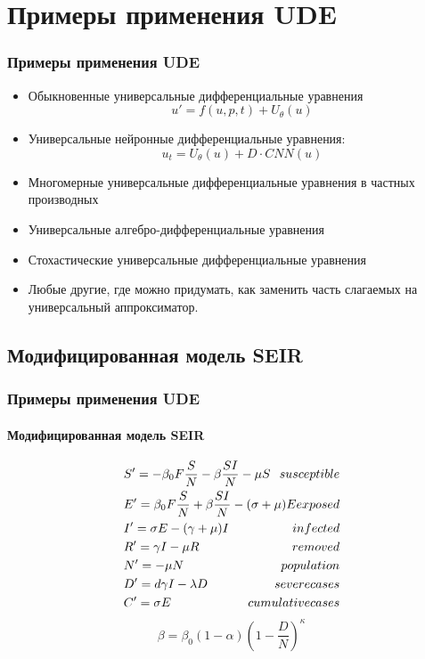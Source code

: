 \documentclass[10pt,pdf,hyperref={unicode}]{beamer}
\begin{document}
		
	\section{Примеры применения UDE}
	
		\begin{frame}
			\frametitle{Примеры применения UDE} 
				\begin{itemize}
					\item Обыкновенные универсальные дифференциальные уравнения
					\begin{displaymath}
						u' = f(u,p,t) + U_\theta(u)
					\end{displaymath}
					\item Универсальные нейронные дифференциальные уравнения:
					\begin{displaymath}
						u_t = U_\theta(u) + D\cdot CNN(u)
					\end{displaymath}
					\item Многомерные универсальные дифференциальные уравнения в частных производных
					\item Универсальные алгебро-дифференциальные уравнения
					\item Стохастические универсальные дифференциальные уравнения
					\item Любые другие, где можно придумать, как заменить часть слагаемых на универсальный аппроксиматор.
				\end{itemize}  
		\end{frame}
	
		
		\subsection{Модифицированная модель SEIR}
		
			\begin{frame}
				\frametitle{Примеры применения UDE} 
				\framesubtitle{Модифицированная модель SEIR}
					\begin{center}
						\begin{displaymath}
							\begin{gathered}
							S' = -\beta_0 F \frac{S}{N} - \beta \frac{S I }{N} - \mu S \hfill susceptible\\
							E' = \beta_0 F \frac{S}{N} + \beta \frac{S I }{N} - (\sigma + \mu)E \hfill exposed \\
							I' = \sigma E - (\gamma + \mu) I \hfill infected\\
							R' = \gamma I - \mu R \hfill removed\\
							N' = -\mu N \hfill population\\
							D' = d\gamma I - \lambda D \hfill severe cases\\
							C' = \sigma E \hfill cumulative cases
							\end{gathered}
						\end{displaymath}
						\begin{displaymath}
							\beta = \beta_0 (1 - \alpha) (1 - \frac{D}{N})^\kappa
						\end{displaymath}
					\end{center}
			\end{frame}
		
\end{document}
